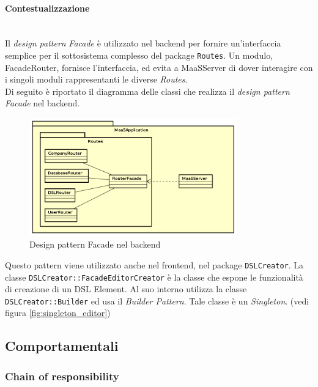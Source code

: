 \paragraph{Contestualizzazione}\mbox{} \\
Il \textit{design pattern} \textit{Facade} è utilizzato nel backend per fornire un'interfaccia semplice per il sottosistema complesso del package \texttt{Routes}. Un modulo, FacadeRouter, fornisce l'interfaccia, ed evita a MaaSServer di dover interagire con i singoli moduli rappresentanti le diverse \textit{Routes}. \\
Di seguito è riportato il diagramma delle classi che realizza il \textit{design pattern} \textit{Facade} nel backend.
\begin{figure}[H]
\centering
\includegraphics[width=0.8\textwidth]{res/sections/backend/facadeRoutes.png}
\caption{Design pattern Facade nel backend}
\end{figure}
Questo pattern viene utilizzato anche nel frontend, nel package \texttt{DSLCreator}. La classe \texttt{DSLCreator::FacadeEditorCreator} è la classe che espone le funzionalità di creazione di un DSL Element. Al suo interno utilizza la classe \texttt{DSLCreator::Builder} ed usa il \textit{Builder Pattern}. Tale classe è un \textit{Singleton}. (vedi figura \ref{fig:singleton_editor})
\subsection{Comportamentali}
\subsubsection{Chain of responsibility}
